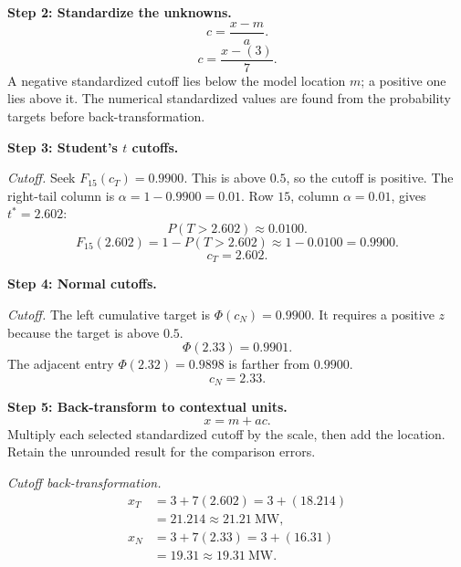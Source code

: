 \begin{enumerate}[leftmargin=*,label=\textbf{\arabic*.},itemsep=12pt,parsep=3pt,topsep=5pt]
\begin{minipage}[t]{\linewidth}
\end{minipage}\par
\par\noindent\begin{minipage}{\linewidth}
\par\textbf{Step 2: Standardize the unknowns.}\nopagebreak\enspace \[
c=\frac{x-m}{a}.
\]
\[
c=\frac{x-(3)}{7}.
\]
A negative standardized cutoff lies below the model location $m$; a positive one lies above it. The numerical standardized values are found from the probability targets before back-transformation.
\end{minipage}\par
\par\noindent\begin{minipage}{\linewidth}
\par\textbf{Step 3: Student's $t$ cutoffs.}\nopagebreak\enspace \par\textit{Cutoff.} Seek $F_{15}(c_{T})=0.9900$. This is above $0.5$, so the cutoff is positive. The right-tail column is $\alpha=1-0.9900=0.01$. Row $15$, column $\alpha=0.01$, gives $t^*=2.602$:\[
P(T>2.602)\approx0.0100.
\]
\[
F_{15}(2.602)=1-P(T>2.602)\approx1-0.0100=0.9900.
\]
\[
c_{T}=2.602.
\]

\end{minipage}\par
\par\textbf{Step 4: Normal cutoffs.}\nopagebreak\enspace \par\noindent\begin{minipage}{\linewidth}
\par\textit{Cutoff.} The left cumulative target is $\Phi(c_{N})=0.9900$. It requires a positive $z$ because the target is above $0.5$.\[
\Phi(2.33)=0.9901.
\]
The adjacent entry $\Phi(2.32)=0.9898$ is farther from $0.9900$.\[
c_{N}=2.33.
\]
\end{minipage}\par

\par\noindent\begin{minipage}{\linewidth}
\par\textbf{Step 5: Back-transform to contextual units.}\nopagebreak\enspace \[
x=m+ac.
\]
Multiply each selected standardized cutoff by the scale, then add the location. Retain the unrounded result for the comparison errors.
\par\textit{Cutoff back-transformation.}
\[
\begin{aligned}x_T&=3+7(2.602)=3+(18.214)\\&=21.214\approx\boxed{21.21\ \text{MW}},\\x_N&=3+7(2.33)=3+(16.31)\\&=19.31\approx\boxed{19.31\ \text{MW}}.\end{aligned}
\]


\end{minipage}
\end{enumerate}
